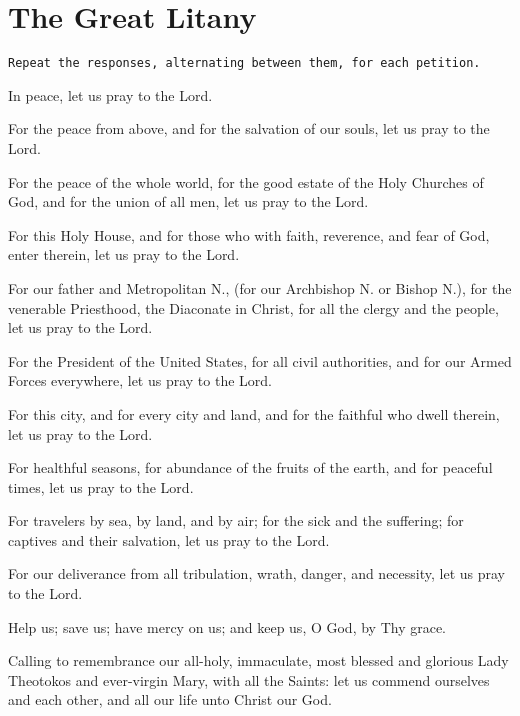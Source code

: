 \documentclass[twoside, letterpaper, 12pt]{report}
\newcommand{\instruction}[1]{%
  \texttt{\scriptsize{#1}}%
}
\newcommand{\centeredsection}[1]{%
  \needspace{10\baselineskip}%
  \section*{\centering{}#1}%
}
\begin{document}

\centeredsection{The Great Litany}
\instruction{Repeat the responses, alternating between them, for each petition.}
\begin{deacon}
\item In peace, let us pray to the Lord.
\end{deacon}

\begin{deacon}
\item For the peace from above, and for the salvation of our souls,
    let us pray to the Lord.
\end{deacon}

\begin{deacon}
\item For the peace of the whole world, for the good estate of the Holy Churches of God,
    and for the union of all men, let us pray to the Lord.
\item For this Holy House, and for those who with faith, reverence, and fear of God,
    enter therein, let us pray to the Lord.
\item For our father and Metropolitan N., (for our Archbishop N. or Bishop N.),
    for the venerable Priesthood, the Diaconate in Christ,
    for all the clergy and the people, let us pray to the Lord.
\item  For the President of the United States, for all civil authorities,
    and for our Armed Forces everywhere, let us pray to the Lord.
\item For this city, and for every city and land, and for the faithful who dwell
    therein, let us pray to the Lord.
\item For healthful seasons, for abundance of the fruits of the earth,
    and for peaceful times, let us pray to the Lord.
\item For travelers by sea, by land, and by air; for the sick and the suffering;
    for captives and their salvation, let us pray to the Lord.
\item For our deliverance from all tribulation, wrath, danger, and necessity,
    let us pray to the Lord.
\item  Help us; save us; have mercy on us; and keep us, O God, by Thy grace.
\item Calling to remembrance our all-holy, immaculate, most blessed and glorious Lady
    Theotokos and ever-virgin Mary, with all the Saints: let us commend ourselves and
    each other, and all our life unto Christ our God.
\end{deacon}
\end{document}
